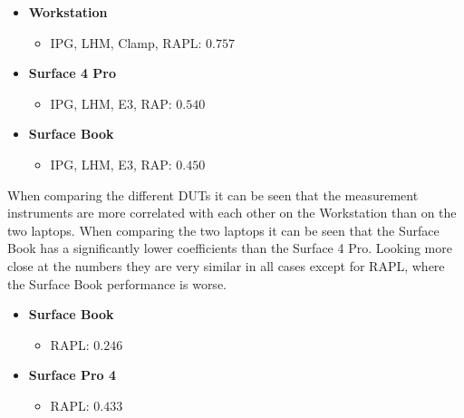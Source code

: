 \begin{itemize}
    \item \textbf{Workstation}
    \begin{itemize}
        \item IPG, LHM, Clamp, RAPL: $0.757$%
    \end{itemize}
    \item \textbf{Surface 4 Pro}
    \begin{itemize}
        \item IPG, LHM, E3, RAP: $0.540$%
    \end{itemize}
    \item \textbf{Surface Book}
    \begin{itemize}
        \item IPG, LHM, E3, RAP: $0.450$ %
    \end{itemize}
\end{itemize}

When comparing the different DUTs it can be seen that the measurement instruments are more correlated with each other on the Workstation than on the two laptops. When comparing the two laptops it can be seen that the Surface Book has a significantly lower coefficients than the Surface 4 Pro. Looking more close at the numbers they are very similar in all cases except for RAPL, where the Surface Book performance is worse.

\begin{itemize}
    \item \textbf{Surface Book}
    \begin{itemize}
        \item RAPL: $0.246$
    \end{itemize}
    \item \textbf{Surface Pro 4}
    \begin{itemize}
        \item RAPL: $0.433$
    \end{itemize}
\end{itemize}














